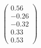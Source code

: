 \documentclass[preview]{standalone}
\begin{document}
\begin{align*}
\begin{pmatrix} 0.56 \\ -0.26 \\ -0.32 \\ 0.33 \\ 0.53 \end{pmatrix}
\end{align*}
\end{document}
